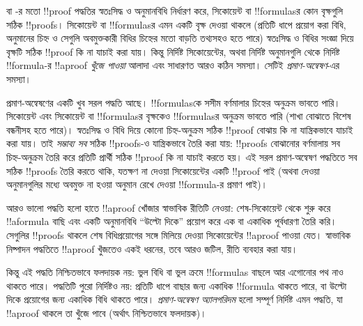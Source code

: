 \documentclass[../../../include/open-logic-section]{subfiles}
\begin{document}


 বা -র মতো
!!{proof} পদ্ধতির স্বতঃসিদ্ধ
ও অনুমানবিধি নির্ধারণ করে,
সিকোয়েন্ট বা !!{formula}sর
কোন বৃক্ষগুলি সঠিক !!{proof}s।
সিকোয়েন্ট বা !!{formula}sর
এমন একটি বৃক্ষ দেওয়া থাকলে
(প্রতিটি ধাপে প্রয়োগ করা বিধি,
অনুমানের চিহ্ন ও সেগুলি
অবমুক্তকারী বিধির চিহ্নের
মতো বাড়তি তথ্যসহও হতে পারে)
স্বতঃসিদ্ধ ও বিধির সংজ্ঞা
দিয়ে বৃক্ষটি সঠিক !!{proof}
কি না যাচাই করা যায়।
কিন্তু নির্দিষ্ট সিকোয়েন্টের,
অথবা নির্দিষ্ট অনুমানগুলি থেকে
নির্দিষ্ট !!{formula}-র
!!a{proof} \emph{খুঁজে পাওয়া}
আলাদা এবং সাধারণত আরও
কঠিন সমস্যা। সেটিই
\emph{প্রমাণ-অন্বেষণ}-এর সমস্যা।

প্রমাণ-অন্বেষণের একটি
খুব সরল পদ্ধতি আছে।
!!{formula}sকে সসীম
বর্ণমালার চিহ্নের অনুক্রম
ভাবতে পারি। সিকোয়েন্ট
এবং সিকোয়েন্ট বা
!!{formula}sর বৃক্ষকেও
!!{formula}sর অনুক্রম ভাবতে পারি
(শাখা বোঝাতে বিশেষ বন্ধনীসহ
হতে পারে)। স্বতঃসিদ্ধ
ও বিধি দিয়ে কোনো
চিহ্ন-অনুক্রম সঠিক
!!{proof} বোঝায় কি না
যান্ত্রিকভাবে যাচাই করা যায়।
তাই \emph{সম্ভাব্য সব}
সঠিক !!{proof}s-ও
যান্ত্রিকভাবে তৈরি করা যায়:
!!{proof}s বোঝানোর
বর্ণমালায় সব চিহ্ন-অনুক্রম
তৈরি করে প্রতিটি প্রার্থী
সঠিক !!{proof} কি না
যাচাই করতে হয়।
এই সরল প্রমাণ-অন্বেষণ
পদ্ধতিতে সব সঠিক
!!{proof}s তৈরি করতে
থাকি, যতক্ষণ না দেওয়া
সিকোয়েন্টের একটি
!!{proof} পাই (অথবা
দেওয়া অনুমানগুলির মধ্যে
অবমুক্ত না হওয়া অনুমান
রেখে দেওয়া !!{formula}-র
প্রমাণ পাই)।

আরও ভালো পদ্ধতি হলো হাতে
!!a{proof} খোঁজার স্বাভাবিক
রীতিটি নেওয়া: শেষ-সিকোয়েন্ট
থেকে শুরু করে !!a{formula}
বাছি এবং একটি অনুমানবিধি
``উল্টো দিকে'' প্রয়োগ
করে এক বা একাধিক পূর্বধারণা
তৈরি করি। সেগুলির
!!{proof}s থাকলে শেষ
বিধিপ্রয়োগের সঙ্গে মিলিয়ে
দেওয়া সিকোয়েন্টের
!!a{proof} পাওয়া যেত।
স্বাভাবিক নিষ্পাদন পদ্ধতিতে
!!a{proof} খুঁজতেও
একই ধরনের, তবে আরও জটিল,
রীতি ব্যবহার করা যায়।

কিন্তু এই পদ্ধতি নিশ্চিতভাবে
ফলদায়ক নয়: ভুল বিধি
বা ভুল ক্রমে !!{formula}s
বাছলে আর এগোনোর পথ
নাও থাকতে পারে। পদ্ধতিটি
পুরো নির্দিষ্টও নয়:
প্রতিটি ধাপে বাছার জন্য
একাধিক !!{formula} থাকতে পারে,
বা উল্টো দিকে প্রয়োগের
জন্য একাধিক বিধি থাকতে পারে।
\emph{প্রমাণ-অন্বেষণ অ্যালগরিদম}
হলো সম্পূর্ণ নির্দিষ্ট এমন
পদ্ধতি, যা !!a{proof}
থাকলে তা খুঁজে পাবে
(অর্থাৎ নিশ্চিতভাবে ফলদায়ক)।
\end{document}
